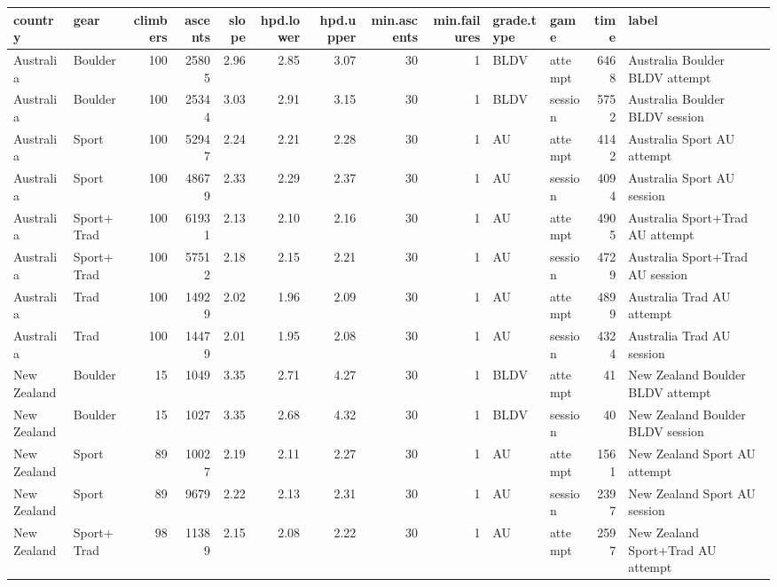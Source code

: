 \begin{table}[ht]
\centering
\begingroup\fontsize{9pt}{10pt}\selectfont
\begin{tabular}{llrrrrrrrllrl}
  \hline
{\bf country} & {\bf gear} & {\bf climbers} & {\bf ascents} & {\bf slope} & {\bf hpd.lower} & {\bf hpd.upper} & {\bf min.ascents} & {\bf min.failures} & {\bf grade.type} & {\bf game} & {\bf time} & {\bf label} \\ 
  \hline
Australia & Boulder & 100 & 25805 & 2.96 & 2.85 & 3.07 &  30 &   1 & BLDV & attempt & 6468 & Australia Boulder BLDV attempt \\ 
  Australia & Boulder & 100 & 25344 & 3.03 & 2.91 & 3.15 &  30 &   1 & BLDV & session & 5752 & Australia Boulder BLDV session \\ 
  Australia & Sport & 100 & 52947 & 2.24 & 2.21 & 2.28 &  30 &   1 & AU & attempt & 4142 & Australia Sport AU attempt \\ 
  Australia & Sport & 100 & 48679 & 2.33 & 2.29 & 2.37 &  30 &   1 & AU & session & 4094 & Australia Sport AU session \\ 
  Australia & Sport+Trad & 100 & 61931 & 2.13 & 2.10 & 2.16 &  30 &   1 & AU & attempt & 4905 & Australia Sport+Trad AU attempt \\ 
  Australia & Sport+Trad & 100 & 57512 & 2.18 & 2.15 & 2.21 &  30 &   1 & AU & session & 4729 & Australia Sport+Trad AU session \\ 
  Australia & Trad & 100 & 14929 & 2.02 & 1.96 & 2.09 &  30 &   1 & AU & attempt & 4899 & Australia Trad AU attempt \\ 
  Australia & Trad & 100 & 14479 & 2.01 & 1.95 & 2.08 &  30 &   1 & AU & session & 4324 & Australia Trad AU session \\ 
  New Zealand & Boulder &  15 & 1049 & 3.35 & 2.71 & 4.27 &  30 &   1 & BLDV & attempt &  41 & New Zealand Boulder BLDV attempt \\ 
  New Zealand & Boulder &  15 & 1027 & 3.35 & 2.68 & 4.32 &  30 &   1 & BLDV & session &  40 & New Zealand Boulder BLDV session \\ 
  New Zealand & Sport &  89 & 10027 & 2.19 & 2.11 & 2.27 &  30 &   1 & AU & attempt & 1561 & New Zealand Sport AU attempt \\ 
  New Zealand & Sport &  89 & 9679 & 2.22 & 2.13 & 2.31 &  30 &   1 & AU & session & 2397 & New Zealand Sport AU session \\ 
  New Zealand & Sport+Trad &  98 & 11389 & 2.15 & 2.08 & 2.22 &  30 &   1 & AU & attempt & 2597 & New Zealand Sport+Trad AU attempt \\ 

\end{tabular}
\end{table}
